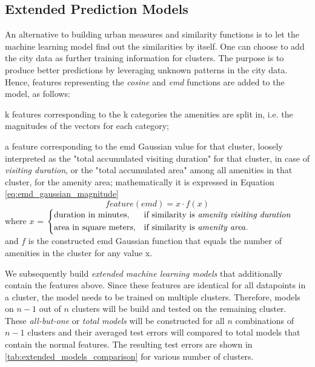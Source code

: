 \documentclass{ws-ijait}
\begin{document}
	\subsection{Extended Prediction Models}
	An alternative to building urban measures and similarity functions is to let the machine learning model find out the similarities by itself. 
	One can choose to add the city data as further training information for clusters. The purpose is to produce better predictions by leveraging unknown patterns in the city data. Hence, features representing the \textit{cosine} and \textit{emd} functions are added to the model, as follows: 
	\begin{romanlist}
		\item k features corresponding to the k categories the amenities are split in, i.e. the magnitudes of the vectors for each category;
		\item a feature corresponding to the emd Gaussian value for that cluster, loosely interpreted as the "total accumulated visiting duration" for that cluster, in case of \textit{visiting duration}, or the "total accumulated area" among all amenities in that cluster, for the amenity area; mathematically it is expressed in Equation \cref{eq:emd_gaussian_magnitude}
		\begin{equation}
		feature(emd)=x \cdot f(x)
		\label{eq:emd_gaussian_magnitude}
		\end{equation}
		{\centering
			where $x$ = 
			$
			\begin{dcases}
			\text{duration in minutes}, & \text{if similarity is \textit{amenity visiting duration}} \\
			\text{area in square meters}, & \text{if similarity is \textit{amenity area}}.
			\end{dcases}
			$ \\
			and $f$ is the constructed emd Gaussian function that equals the number of amenities in the cluster for any value x.}
	\end{romanlist}
	
	We subsequently build \textit{extended machine learning models} that additionally contain the features above. Since these features are identical for all datapoints in a cluster, the model needs to be trained on multiple clusters. Therefore, models on $n-1$ out of $n$ clusters will be build and tested on the remaining cluster. These \textit{all-but-one} or \textit{total models} will be constructed for all $n$ combinations of $n-1$ clusters and their averaged test errors will compared to total models that contain the normal features. The resulting test errors are shown in \cref{tab:extended_models_comparison} for various number of clusters. 
	
\end{document}

